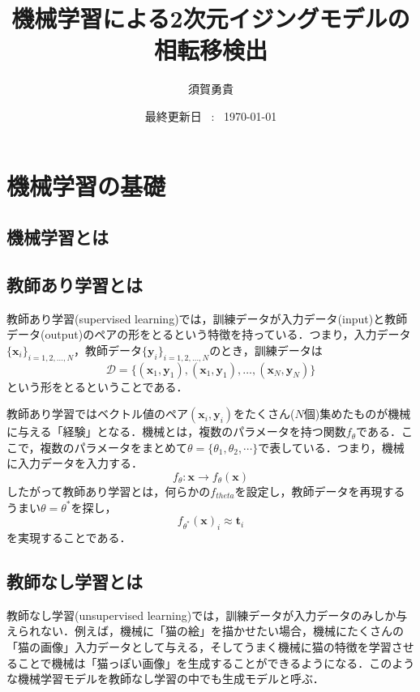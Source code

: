 \documentclass[a4paper,11pt]{jsarticle}
\begin{document}
\title{機械学習による2次元イジングモデルの相転移検出}
\author{須賀勇貴}
\date{最終更新日 \ : \ \today}
\maketitle

\tableofcontents
\clearpage

\section{機械学習の基礎}
\subsection{機械学習とは}
  \subsection{教師あり学習とは}
  教師あり学習(supervised learning)では，訓練データが入力データ(input)と教師データ(output)のペアの形をとるという特徴を持っている．つまり，入力データ$\{\bm{x}_i\}_{i=1,2,\dots,N}$，教師データ$\{\bm{y}_i\}_{i=1,2,\dots,N}$のとき，訓練データは
  \begin{equation*}
    \mathcal{D} = \{ (\bm{x}_1, \bm{y}_1), (\bm{x}_1, \bm{y}_1), \dots ,(\bm{x}_N, \bm{y}_N) \}
  \end{equation*}
  という形をとるということである．\par
  教師あり学習ではベクトル値のペア$(\bm{x}_i, \bm{y}_i)$をたくさん($N$個)集めたものが機械に与える「経験」となる．機械とは，複数のパラメータを持つ関数$f_{\theta}$である．ここで，複数のパラメータをまとめて$\theta = \{ \theta_1, \theta_2, \cdots \}$で表している．つまり，機械に入力データを入力する．
  \begin{equation*}
    f_{\theta} : \bm{x} \rightarrow f_{\theta}(\bm{x})
  \end{equation*}
  したがって教師あり学習とは，何らかの$f_{theta}$を設定し，教師データを再現するうまい$\theta = \theta^*$を探し，
  \begin{equation*}
    f_{\theta^*}(\bm{x})_i \approx \bm{t}_i
  \end{equation*}
  を実現することである．

  \subsection{教師なし学習とは}
  教師なし学習(unsupervised learning)では，訓練データが入力データのみしか与えられない．例えば，機械に「猫の絵」を描かせたい場合，機械にたくさんの「猫の画像」入力データとして与える，そしてうまく機械に猫の特徴を学習させることで機械は「猫っぽい画像」を生成することができるようになる．このような機械学習モデルを教師なし学習の中でも生成モデルと呼ぶ．
\end{document}
